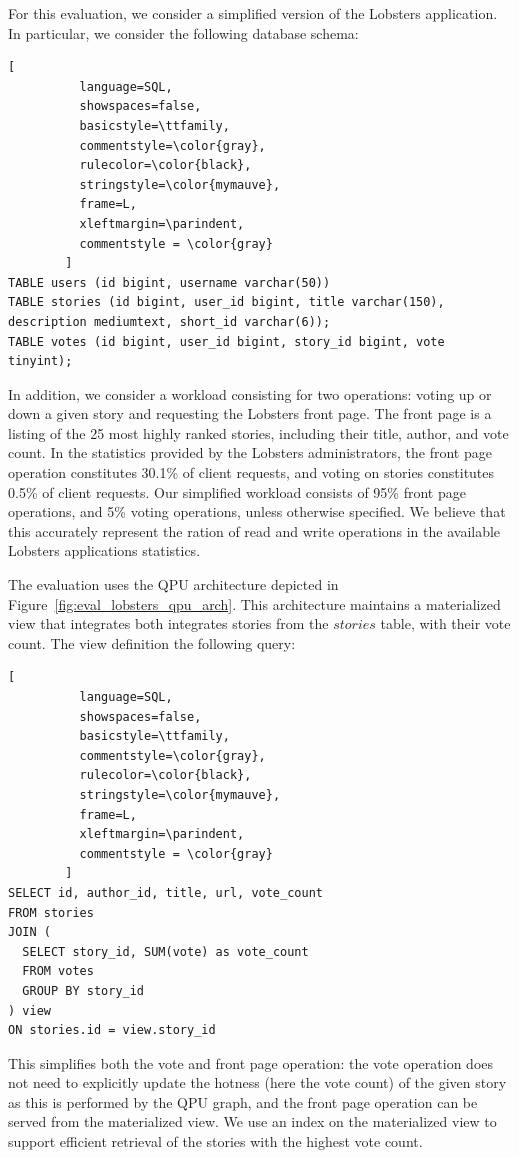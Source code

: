 For this evaluation, we consider a simplified version of the Lobsters application.
In particular, we consider the following database schema:

\begin{lstlisting}[
          language=SQL,
          showspaces=false,
          basicstyle=\ttfamily,
          commentstyle=\color{gray},
          rulecolor=\color{black},
          stringstyle=\color{mymauve},
          frame=L,
          xleftmargin=\parindent,
          commentstyle = \color{gray}
        ]
TABLE users (id bigint, username varchar(50))
TABLE stories (id bigint, user_id bigint, title varchar(150), description mediumtext, short_id varchar(6));
TABLE votes (id bigint, user_id bigint, story_id bigint, vote tinyint);
\end{lstlisting}

In addition, we consider a workload consisting for two operations: voting up or down a given story and requesting the Lobsters
front page.
The front page is a listing of the 25 most highly ranked stories, including their title, author, and vote count.
In the statistics provided by the Lobsters administrators, the front page operation constitutes 30.1\% of client requests,
and voting on stories constitutes 0.5\% of client requests.
Our simplified workload consists of 95\% front page operations, and 5\% voting operations, unless otherwise specified.
We believe that this accurately represent the ration of read and write operations in the available Lobsters applications
statistics.

The evaluation uses the QPU architecture depicted in Figure~\ref{fig:eval_lobsters_qpu_arch}.
This architecture maintains a materialized view that integrates both integrates stories from the $stories$ table,
with their vote count.
The view definition the following query:

\begin{lstlisting}[
          language=SQL,
          showspaces=false,
          basicstyle=\ttfamily,
          commentstyle=\color{gray},
          rulecolor=\color{black},
          stringstyle=\color{mymauve},
          frame=L,
          xleftmargin=\parindent,
          commentstyle = \color{gray}
        ]
SELECT id, author_id, title, url, vote_count
FROM stories
JOIN (
  SELECT story_id, SUM(vote) as vote_count
  FROM votes
  GROUP BY story_id
) view
ON stories.id = view.story_id
\end{lstlisting}

This simplifies both the vote and front page operation:
the vote operation does not need to explicitly update the hotness (here the vote count) of the given story as this
is performed by the QPU graph,
and the front page operation can be served from the materialized view.
We use an index on the materialized view to support efficient retrieval of the stories with the highest vote count.

